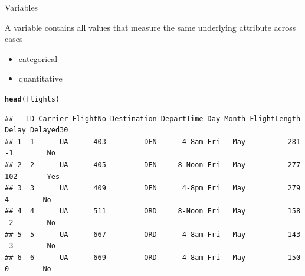 \documentclass[10pt]{beamer}\usepackage[]{graphicx}\usepackage[]{color}
\makeatletter
\newcommand{\hlstd}[1]{\textcolor[rgb]{0.345,0.345,0.345}{#1}}%
\newcommand{\hlkwd}[1]{\textcolor[rgb]{0.737,0.353,0.396}{\textbf{#1}}}%
\newenvironment{kframe}{%
 \def\at@end@of@kframe{}%
 \ifinner\ifhmode%
  \def\at@end@of@kframe{\end{minipage}}%
  \begin{minipage}{\columnwidth}%
 \fi\fi%
 \def\FrameCommand##1{\hskip\@totalleftmargin \hskip-\fboxsep
 \colorbox{shadecolor}{##1}\hskip-\fboxsep
     \hskip-\linewidth \hskip-\@totalleftmargin \hskip\columnwidth}%
 \MakeFramed {\advance\hsize-\width
   \@totalleftmargin\z@ \linewidth\hsize
   \@setminipage}}%
 {\par\unskip\endMakeFramed%
 \at@end@of@kframe}
\newenvironment{knitrout}{}{} %
\makeatother
\begin{document}
\begin{frame}[fragile]{Variables}

A variable contains all values that measure the same underlying attribute across cases

\begin{itemize}
\item categorical
\item quantitative
\end{itemize}

\begin{knitrout}\scriptsize
{}\color{fgcolor}\begin{kframe}
\begin{alltt}
\hlkwd{head}\hlstd{(flights)}
\end{alltt}
\begin{verbatim}
##   ID Carrier FlightNo Destination DepartTime Day Month FlightLength Delay Delayed30
## 1  1      UA      403         DEN      4-8am Fri   May          281    -1        No
## 2  2      UA      405         DEN     8-Noon Fri   May          277   102       Yes
## 3  3      UA      409         DEN      4-8pm Fri   May          279     4        No
## 4  4      UA      511         ORD     8-Noon Fri   May          158    -2        No
## 5  5      UA      667         ORD      4-8am Fri   May          143    -3        No
## 6  6      UA      669         ORD      4-8am Fri   May          150     0        No
\end{verbatim}
\end{kframe}
\end{knitrout}

\end{frame}
\end{document}
